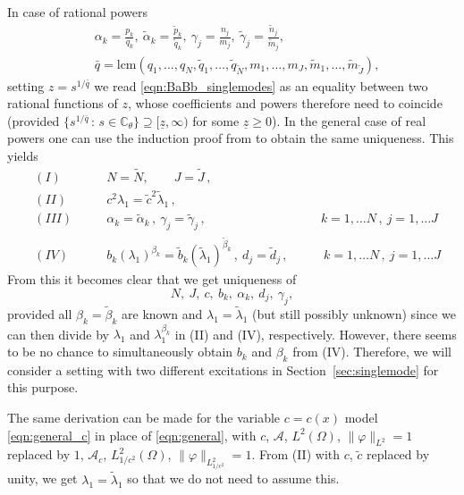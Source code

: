 In case of rational powers 
\begin{equation}\label{eqn:rationalpowers}
\begin{aligned}
&\alpha_k=\frac{p_k}{q_k}, \ \tilde{\alpha}_k=\frac{\tilde{p}_k}{\tilde{q}_k}, \ \gamma_j=\frac{n_j}{m_j}, \  \tilde{\gamma}_j=\frac{\tilde{n}_j}{\tilde{m}_j}, \\
&\bar{q}=\mbox{lcm}(q_1,\ldots,q_{N},\tilde{q}_1,\ldots,\tilde{q}_{\tilde{N}},m_1,\ldots,m_{J},\tilde{m}_1,\ldots,\tilde{m}_{\tilde{J}}),
\end{aligned}
\end{equation} 
setting $z=s^{1/\bar{q}}$ we read \eqref{eqn:BaBb_singlemodes} as an equality between two rational functions of $z$, whose coefficients and powers therefore need to coincide (provided $\{s^{1/\bar{q}}\, : \, s\in\mathbb{C}_\theta\}\supseteq [\underline{z},\infty)$ for some $\underline{z}\geq0$).
In the general case of real powers one can use the induction proof from \cite[Theorem 1.1]{JinKian:2021} to obtain the same uniqueness.
This yields
\[
\begin{aligned}
&(I)\qquad&&N=\tilde{N},\qquad J=\tilde{J}\,,\\
&(II)&&c^2\lambda_1=\tilde{c}^2\tilde{\lambda}_1\,, \\
&(III)&&\alpha_k=\tilde{\alpha}_k\,,\ \gamma_j=\tilde{\gamma}_j\,, &&k=1,\ldots N\,, \ j=1,\ldots J\\
&(IV)&&b_k(\lambda_1)^{\beta_{k}}
=\tilde{b}_k(\tilde{\lambda}_1)^{\tilde{\beta}_{k}}\,, \ d_j=\tilde{d}_j\,, \quad 
&& \ k=1,\ldots N\,, \ j=1,\ldots J
\end{aligned}
\]
From this it becomes clear that we get uniqueness of 
\[
N, \ J, \ c, \ b_{k}, \ \alpha_k, \ d_j, \ \gamma_j,
\]
provided all $\beta_k=\tilde{\beta}_k$ are known and $\lambda_1=\tilde{\lambda}_1$ (but still possibly unknown) since we can then divide by $\lambda_1$ and $\lambda_1^{\beta_k}$ in (II) and (IV), respectively.
However, there seems to be no chance to simultaneously obtain $b_k$ and $\beta_k$ from (IV). Therefore, we will consider a setting with two different excitations in Section~\ref{sec:singlemode} for this purpose.

The same derivation can be made for the variable $c=c(x)$ model \eqref{eqn:general_c} in place of \eqref{eqn:general}, with 
$c$, $\mathcal{A}$, $L^2(\Omega)$, $\|\varphi\|_{L^2}=1$ replaced by 
$1$, $\mathcal{A}_c$, $L^2_{1/c^2}(\Omega)$, $\|\varphi\|_{L^2_{1/c^2}}=1$. 
From (II) with $c$, $\tilde{c}$ replaced by unity, we get $\lambda_1=\tilde{\lambda}_1$ so that we do not need to assume this. 

